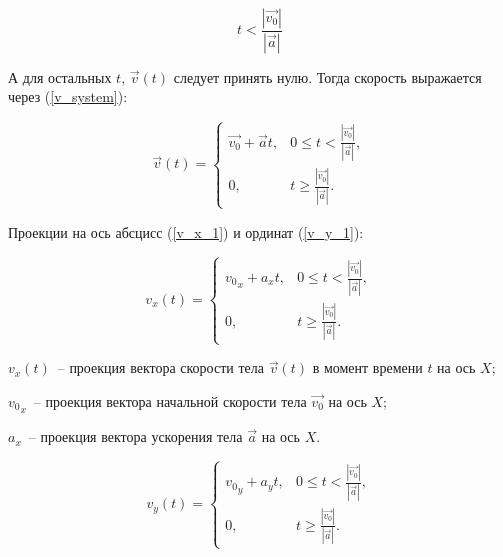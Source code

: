 
\newcommand\Constrainttle{
  t < \frac{\left|\vec{v_0}\right|}{\left|\vec{a}\right|}
}

\newcommand\Constrainttge{
  t \geqslant \frac{\left|\vec{v_0}\right|}{\left|\vec{a}\right|}
}

\begin{equation}\label{constraint_t_1}
  \Constrainttle
\end{equation}

А для остальных \(t\), \(\vec{v}(t)\) следует принять нулю. Тогда скорость выражается через (\ref{v_system}):

\begin{equation}\label{v_system}
  \vec{v}(t) =
  \begin{cases}
    \vec{v_0} + \vec{a}t, & 0 \leqslant \Constrainttle, \\
    0,                    & \Constrainttge .
  \end{cases}
\end{equation}

Проекции на ось абсцисс (\ref{v_x_1}) и ординат (\ref{v_y_1}):

\begin{equation}\label{v_x_1}
  v_x(t) =
  \begin{cases}
    {v_0}_x + a_x t, & 0 \leqslant \Constrainttle, \\
    0,               & \Constrainttge.
  \end{cases}
\end{equation}

\begin{Underequation}
  \(v_x(t)\)~-- проекция вектора скорости тела \(\vec{v}(t)\) в момент времени \(t\) на ось \(X\);

  \({v_0}_x\)~-- проекция вектора начальной скорости тела \(\vec{v_0}\) на ось \(X\);

  \(a_x\)~-- проекция вектора ускорения тела \(\vec{a}\) на ось \(X\).
\end{Underequation}

\begin{equation}\label{v_y_1}
  v_y(t) =
  \begin{cases}
    {v_0}_y + a_y t, & 0  \leqslant \Constrainttle, \\
    0,               & \Constrainttge.
  \end{cases}
\end{equation}

